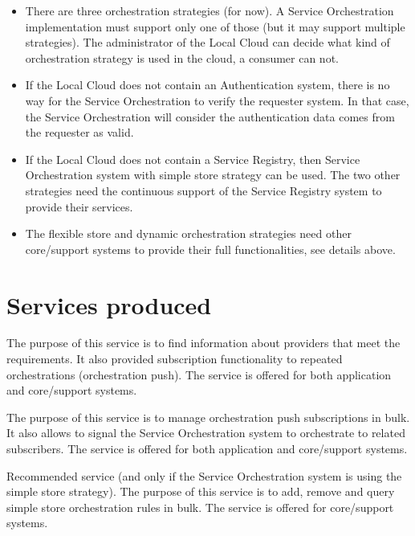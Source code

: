 \documentclass[a4paper]{arrowhead}
\begin{document}
\begin{itemize}
    \item There are three orchestration strategies (for now). A Service Orchestration implementation must support only one of those (but it may support multiple strategies). The administrator of the Local Cloud can decide what kind of orchestration strategy is used in the cloud, a consumer can not.
    \item If the Local Cloud does not contain an Authentication system, there is no way for the Service Orchestration to verify the requester system. In that case, the Service Orchestration will consider the authentication data comes from the requester as valid.
    \item If the Local Cloud does not contain a Service Registry, then Service Orchestration system with simple store strategy can be used. The two other strategies need the continuous support of the Service Registry system to provide their services.
    \item The flexible store and dynamic orchestration strategies need other core/support systems to provide their full functionalities, see details above.
\end{itemize} 

\newpage

\section{Services produced}
\label{sec:services}

The purpose of this service is to find information about providers that meet the requirements. It also provided subscription functionality to repeated orchestrations (orchestration push). The service is offered for both application and core/support systems. 

The purpose of this service is to manage orchestration push subscriptions in bulk. It also allows to signal the Service Orchestration system to orchestrate to related subscribers. The service is offered for both application and core/support systems. 

Recommended service (and only if the Service Orchestration system is using the simple store strategy). The purpose of this service is to add, remove and query simple store orchestration rules in bulk. The service is offered for core/support systems.
\end{document}
